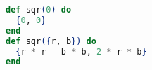 \begin{lstlisting}[language=Elixir]
def sqr(0) do
  {0, 0}
end
def sqr({r, b}) do
  {r * r - b * b, 2 * r * b}
end
\end{lstlisting}